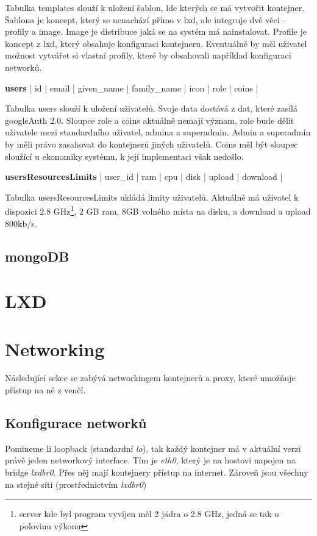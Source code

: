 \documentclass[a4paper,oneside,12pt]{report}
\begin{document}
Tabulka templates slouží k uložení šablon, lde kterých se má vytvořit kontejner.
Šablona je koncept, který se nenachází přímo v lxd, ale integruje dvě věci -- profily a image.
Image je distribuce jaká se na systém má nainstalovat.
Profile je koncept z lxd, který obsahuje konfiguraci kontejneru.
Eventuálně by měl uživatel možnost vytvářet si vlastní profily, které by obsahovali například konfiguraci networků.

\vspace{0.3cm}
\noindent
\textbf{users} | id | email | given\_name | family\_name | icon | role | coins |

Tabulka users slouží k uložení uživatelů.
Svoje data dostává z dat, které zasílá googleAuth 2.0.
Sloupce role a coins aktuálně nemají význam, role bude dělit uživatele mezi standardního uživatel, admina a superadmin.
Admin a superadmin by měli právo zasahovat do kontejnerů jiných uživatelů.
Coins měl být sloupec sloužící u ekonomiky systému, k její implementaci však nedošlo.


\vspace{0.3cm}
\noindent
\textbf{usersResourcesLimits} | user\_id | ram | cpu | disk | upload | download |

Tabulka usersResourcesLimits ukládá limity uživatelů.
Aktuálně má uživatel k dispozici 2.8 GHz\footnote{server kde byl program vyvíjen měl 2 jádra o 2.8 GHz, jedná se tak o polovinu výkonu}, 2 GB ram, 8GB volného místa na disku, a download a upload 800kb/s.

\subsection{mongoDB}


\section{LXD}

\section{Networking}

Následující sekce se zabývá networkingem kontejnerů a proxy, které umožňuje přístup na ně z venčí.

\subsection{Konfigurace networků}

Pomineme li loopback (standardní \textit{lo}), tak každý kontejner má v aktuální verzi právě jeden networkový interface.
Tím je \textit{eth0}, který je na hostovi napojen na bridge \textit{lxdbr0}.
Přes něj mají kontejnery přístup na internet.
Zároveň jsou všechny na stejné síti (prostřednictvím \textit{lxdbr0})
\end{document}
